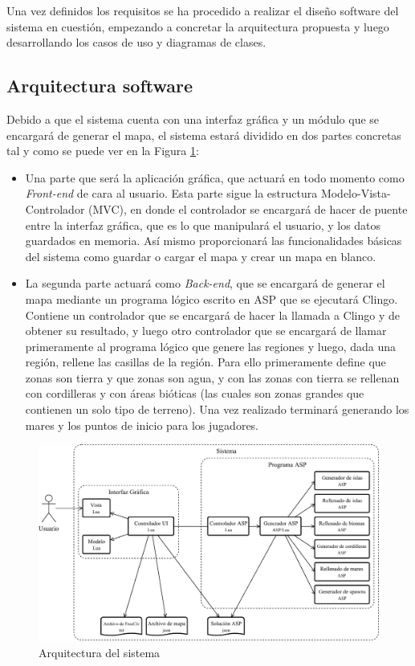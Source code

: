 Una vez definidos los requisitos se ha procedido a realizar el diseño software del sistema en cuestión, empezando a concretar la arquitectura propuesta y luego desarrollando los casos de uso y diagramas de clases.

\subsection{Arquitectura software}
\label{subsec:arquitectura}

Debido a que el sistema cuenta con una interfaz gráfica y un módulo que se encargará de generar el mapa, el sistema estará dividido en dos partes concretas tal y como se puede ver en la Figura \ref{fig:arquitectura}:

\begin{itemize}
	\item Una parte que será la aplicación gráfica, que actuará en todo momento como \textit{Front-end} de cara al usuario. Esta parte sigue la estructura Modelo-Vista-Controlador (MVC), en donde el controlador se encargará de hacer de puente entre la interfaz gráfica, que es lo que manipulará el usuario, y los datos guardados en memoria. Así mismo proporcionará las funcionalidades básicas del sistema como guardar o cargar el mapa y crear un mapa en blanco.
	\item La segunda parte actuará como \textit{Back-end}, que se encargará de generar el mapa mediante un programa lógico escrito en ASP que se ejecutará Clingo. Contiene un controlador que se encargará de hacer la llamada a Clingo y de obtener su resultado, y luego otro controlador que se encargará de llamar primeramente al programa lógico que genere las regiones y luego, dada una región, rellene las casillas de la región. Para ello primeramente define que zonas son tierra y que zonas son agua, y con las zonas con tierra se rellenan con cordilleras y con áreas bióticas (las cuales son zonas grandes que contienen un solo tipo de terreno). Una vez realizado terminará generando los mares y los puntos de inicio para los jugadores.
\end{itemize}

\begin{figure}[!h]
	\centering
	\includegraphics[width=\textwidth]{images/arquitectura.pdf}
	\caption{Arquitectura del sistema}
	\label{fig:arquitectura}
\end{figure}

